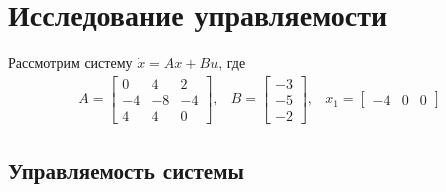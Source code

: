 \section{Исследование управляемости}

Рассмотрим систему $\dot{x} = Ax + Bu$, где 
\begin{equation}
    \begin{array}{ccc}
        A = \begin{bmatrix}
            0 & 4 & 2 \\
            -4 & -8 & -4 \\
            4 & 4 & 0
        \end{bmatrix}, &
        B = \begin{bmatrix}
            -3 \\
            -5 \\
            -2
        \end{bmatrix}, &
        x_1 = \begin{bmatrix}
            -4 & 0 & 0
        \end{bmatrix}
    \end{array}
\end{equation}

\subsection{Управляемость системы}
